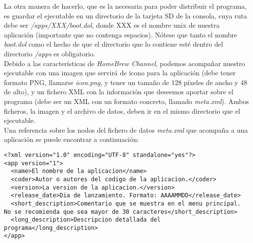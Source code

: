 La otra manera de hacerlo, que es la necesaria para poder distribuir el programa, es guardar el ejecutable en un directorio de la tarjeta SD de la consola, cuya ruta debe ser \emph{/apps/XXX/boot.dol}, donde XXX es el nombre unix de nuestra aplicación (importante que no contenga espacios). Nótese que tanto el nombre \emph{boot.dol} como el hecho de que el directorio que lo contiene esté dentro del directorio \emph{/apps} es obligatorio. \\

Debido a las características de \emph{HomeBrew Channel}, podemos acompañar nuestro ejecutable con una imagen que servirá de icono para la aplicación (debe tener formato PNG, llamarse \emph{icon.png}, y tener un tamaño de 128 píxeles de ancho y 48 de alto), y un fichero XML con la información que deseemos aportar sobre el programa (debe ser un XML con un formato concreto, llamado \emph{meta.xml}). Ambos ficheros, la imagen y el archivo de datos, deben ir en el mismo directorio que el ejecutable. \\

Una referencia sobre los nodos del fichero de datos \emph{meta.xml} que acompaña a una aplicación se puede encontrar a continuación:

\begin{lstlisting}[style=XML]
<?xml version="1.0" encoding="UTF-8" standalone="yes"?>
<app version="1">
  <name>El nombre de la aplicacion</name>
  <coder>Autor o autores del codigo de la aplicacion.</coder>
  <version>La version de la aplicacion.</version>
  <release_date>Dia de lanzamiento. Formato: AAAAMMDD</release_date>
  <short_description>Comentario que se muestra en el menu principal. No se recomienda que sea mayor de 30 caracteres</short_description>
  <long_description>Descripcion detallada del programa</long_description>
</app>
\end{lstlisting}

\clearpage

